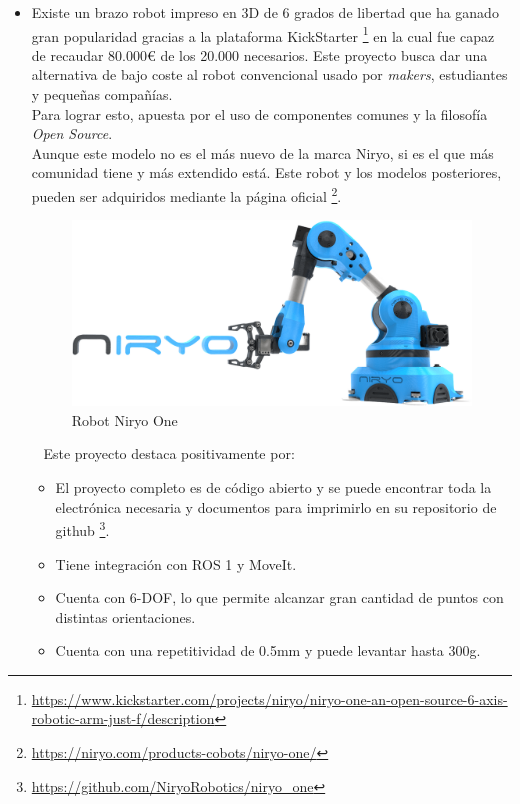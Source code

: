 \begin{itemize}
    \item Existe un brazo robot impreso en 3D de 6 grados de libertad que ha ganado gran popularidad gracias a la plataforma 
    KickStarter \footnote{\url{https://www.kickstarter.com/projects/niryo/niryo-one-an-open-source-6-axis-robotic-arm-just-f/description}} en la cual fue 
    capaz de recaudar 80.000\euro \xspace de los 20.000 necesarios. 
    Este proyecto busca dar una alternativa de bajo coste al robot convencional usado por \textit{makers}, estudiantes y pequeñas compañías.\\
    Para lograr esto, apuesta por el uso de componentes comunes y la filosofía \textit{Open Source}. \\
    Aunque este modelo no es el más nuevo de la marca Niryo, si es el que más comunidad tiene y más extendido está.
    Este robot y los modelos posteriores, pueden ser adquiridos mediante la página oficial \footnote{\url{https://niryo.com/products-cobots/niryo-one/}}.
    \\
    \begin{figure} [ht!]
        \begin{center}
          \includegraphics[width=11cm]{figs/niryo.png}
        \end{center}
        \caption{Robot Niryo One}
        \label{fig:niryo}
    \end{figure}\ 
    \newpage
    Este proyecto destaca positivamente por:
    \begin{itemize}
    \item El proyecto completo es de código abierto y se puede encontrar toda la electrónica necesaria y documentos para imprimirlo en 
    su repositorio de github \footnote{\url{https://github.com/NiryoRobotics/niryo_one}}.
    \item Tiene integración con ROS 1 y MoveIt.
    \item Cuenta con 6-DOF, lo que permite alcanzar gran cantidad de puntos con distintas orientaciones.
    \item Cuenta con una repetitividad de 0.5mm y puede levantar hasta 300g.

\end{itemize}
\end{itemize}
